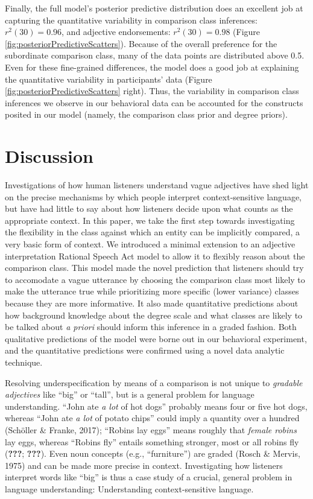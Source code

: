 \documentclass[doc]{apa6}
\begin{document}
Finally, the full model's posterior predictive distribution does an excellent job at capturing the quantitative variability in comparison class inferences: \(r^2(30) = 0.96\), and adjective endorsements: \(r^2(30) = 0.98\) (Figure \ref{fig:posteriorPredictiveScatters}). Because of the overall preference for the subordinate comparison class, many of the data points are distributed above 0.5. Even for these fine-grained differences, the model does a good job at explaining the quantitative variability in participants' data (Figure \ref{fig:posteriorPredictiveScatters} right). Thus, the variability in comparison class inferences we observe in our behavioral data can be accounted for the constructs posited in our model (namely, the comparison class prior and degree priors).

\section{Discussion}

Investigations of how human listeners understand vague adjectives have
shed light on the precise mechanisms by which people interpret
context-sensitive language, but have had little to say about how
listeners decide upon what counts as the appropriate context. In this
paper, we take the first step towards investigating the flexibility in
the class against which an entity can be implicitly compared, a very
basic form of context. We introduced a minimal extension to an adjective
interpretation Rational Speech Act model to allow it to flexibly reason
about the comparison class. This model made the novel prediction that
listeners should try to accomodate a vague utterance by choosing the
comparison class most likely to make the utterance true while
prioritizing more specific (lower variance) classes because they are
more informative. It also made quantitative predictions about how
background knowledge about the degree scale and what classes are likely
to be talked about \emph{a priori} should inform this inference in a
graded fashion. Both qualitative predictions of the model were borne out
in our behavioral experiment, and the quantitative predictions were
confirmed using a novel data analytic technique.

Resolving underspecification by means of a comparison is not unique to
\emph{gradable adjectives} like ``big'' or ``tall'', but is
a general problem for language understanding. ``John ate \emph{a
lot} of hot dogs'' probably means four or five hot dogs, whereas
``John ate \emph{a lot} of potato chips'' could imply a quantity
over a hundred (Schöller \& Franke, 2017); ``Robins lay eggs''
means roughly that \emph{female robins} lay eggs, whereas
``Robins fly'' entails something stronger, most or all robins fly
({\textbf{???}}; {\textbf{???}}). Even noun concepts (e.g.,
``furniture'') are graded (Rosch \& Mervis, 1975) and can be made
more precise in context. Investigating how listeners interpret words
like ``big'' is thus a case study of a crucial, general problem in
language understanding: Understanding context-sensitive language.
\end{document}
